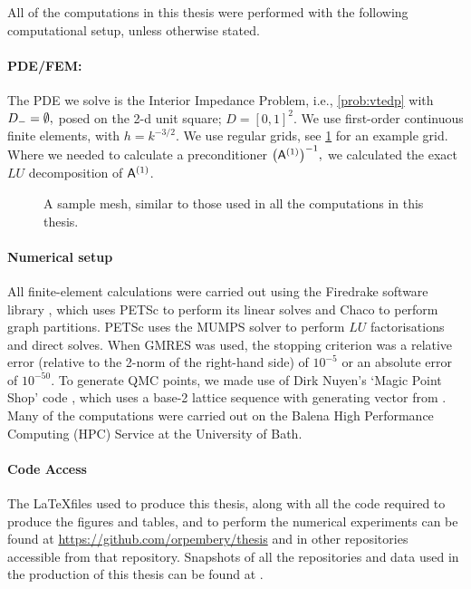 All of the computations in this thesis were performed with the following computational setup, unless otherwise stated.

\paragraph{PDE/FEM:}
The PDE we solve is the Interior Impedance Problem, i.e., \cref{prob:vtedp} with $D_{-} = \emptyset,$ posed on the 2-d unit square; $D = [0,1]^2.$ We use first-order continuous finite elements, with $h = k^{-3/2}$. We use regular grids, see \cref{fig:grid} for an example grid. Where we needed to calculate a preconditioner $\AmatoI,$ we calculated the exact $LU$ decomposition of $\mathsf{A}^{(1)}$.

\begin{figure}[h]
  \centering
  
  \caption{A sample mesh, similar to those used in all the computations in this thesis.\label{fig:grid}}
  \end{figure}

\paragraph{Numerical setup}
All finite-element calculations were carried out using the Firedrake software library \cite{RaHaMiLaLuMcBeMaKe:16,LuVaRaBeRaHaKe:15}, which uses PETSc to perform its linear solves \cite{BaAbAsBrBrBuDaEiGrKaKnMaMcMiMuRuSaSmZaZhZh:18,BaGrMcSm:97,DaPaKlCo:11,BaAbAdBrBrBuDaDeEiGrKaKaKnMaMcMiMuRuSaSmZaZh:19} and Chaco \cite{HeLe:95} to perform graph partitions. PETSc uses the MUMPS \cite{AmDuLEKo:01,AmGuLEPr:06} solver to perform $LU$ factorisations and direct solves. When GMRES was used, the stopping criterion was a relative error (relative to the 2-norm of the right-hand side) of $10^{-5}$ or an absolute error of $10^{-50}.$ To generate QMC points, we made use of Dirk Nuyen's `Magic Point Shop' code \cite{Nu,KuNu:16}, which uses a base-2 lattice sequence with generating vector from \cite{CoKuNu:06}. Many of the computations were carried out on the Balena High Performance Computing (HPC) Service at the University of Bath.

\paragraph{Code Access}
The \LaTeX files used to produce this thesis, along with all the code required to produce the figures and tables, and to perform the numerical experiments can be found at \url{https://github.com/orpembery/thesis} and in other repositories accessible from that repository. Snapshots of all the repositories and data used in the production of this thesis can be found at \cite{hhfd,hhnp,hhmc,rnbpc,rhhmc,pge,rhhmcd}.
